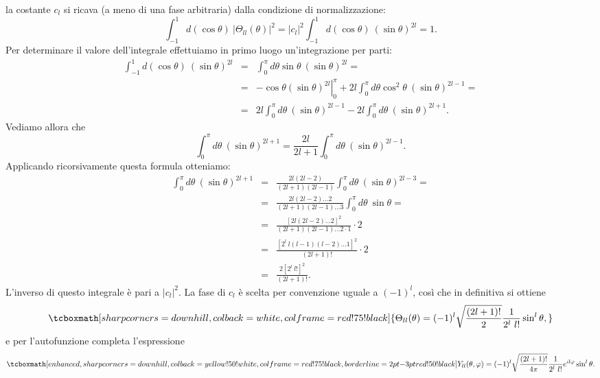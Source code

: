 la costante $c_l$ si ricava (a meno di una fase arbitraria) dalla condizione di normalizzazione:
	\begin{equation}
		\int _{-1} ^1 d(\cos \theta )\ \vert \Theta _{ll} (\theta ) \vert ^2 = \vert c_l \vert ^2 \int _{-1} ^1 d(\cos \theta )\ \left( \sin \theta \right) ^{2l} =1.
	\end{equation}
Per determinare il valore dell'integrale effettuiamo in primo luogo un'integrazione per parti:
	\begin{eqnarray}
\int _{-1} ^1 d(\cos \theta )\ (\sin \theta ) ^{2l} 			&=& \int _{0} ^{\pi} d\theta \sin \theta\ (\sin \theta ) ^{2l} = \nonumber \\
		&=& \left. -\cos \theta (\sin \theta ) ^{2l} \right\vert _0 ^{\pi} +2l\int _{0} ^{\pi} d\theta \cos ^2 \theta \ (\sin \theta ) ^{2l-1} = \nonumber \\
		&=&  2l\int _{0} ^{\pi} d\theta \ (\sin \theta ) ^{2l-1} - 2l\int _{0} ^{\pi} d\theta  \ (\sin \theta ) ^{2l+1} .
	\end{eqnarray}
Vediamo allora che 
	\begin{equation}
		\int _{0} ^{\pi} d\theta \ (\sin \theta ) ^{2l+1}=\frac{2l}{2l+1} \int _{0} ^{\pi} d\theta \ (\sin \theta ) ^{2l-1}.
	\end{equation}
Applicando ricorsivamente questa formula otteniamo:
	\begin{eqnarray}
		\int _{0} ^{\pi} d\theta \ (\sin \theta ) ^{2l+1} & = & \frac{2l(2l-2)}{(2l+1)(2l-1)} \int _{0} ^{\pi} d\theta \ (\sin \theta ) ^{2l-3} = \nonumber \\
		&=& \frac{2l(2l-2)\dots 2}{(2l+1)(2l-1)\dots 3} \int _{0} ^{\pi} d\theta \ \sin \theta =\nonumber \\
		&=& \frac{[2l(2l-2)\dots 2]^2}{(2l+1)(2l-1)\dots 2\cdot 1}\cdot 2 \nonumber \\
		& = &  \frac{[2^l\ l(l-1)(l-2)\dots 1]^2}{(2l+1)!}\cdot 2 \nonumber \\
		&=& \frac{2[2^l\ l!]^2}{(2l+1)!}.
	\end{eqnarray}
L'inverso di questo integrale è pari a $\vert c_l \vert ^2$. La fase di $c_l$ è scelta per convenzione uguale a $(-1)^l$, così che in definitiva si ottiene
	\begin{equation}
		\tcboxmath[sharp corners=downhill, colback=white, colframe=red!75!black]{
			\Theta _{ll} (\theta ) = (-1)^l \sqrt{\frac{(2l+1)!}{2}}\frac{1}{2^l\ l!}\sin^l \theta ,
			}
	\end{equation}
e per l'autofunzione completa l'espressione
	\begin{equation}
		\tcboxmath[enhanced, sharp corners=downhill, colback=yellow!50!white, colframe=red!75!black, borderline={2pt}{-3pt}{red!50!black}]{
			Y_{ll} (\theta , \varphi) = (-1)^l \sqrt{\frac{(2l+1)!}{4\pi}}\frac{1}{2^l\ l!}e^{il\varphi} \sin ^l \theta  .
			}
	\end{equation}\\
	

